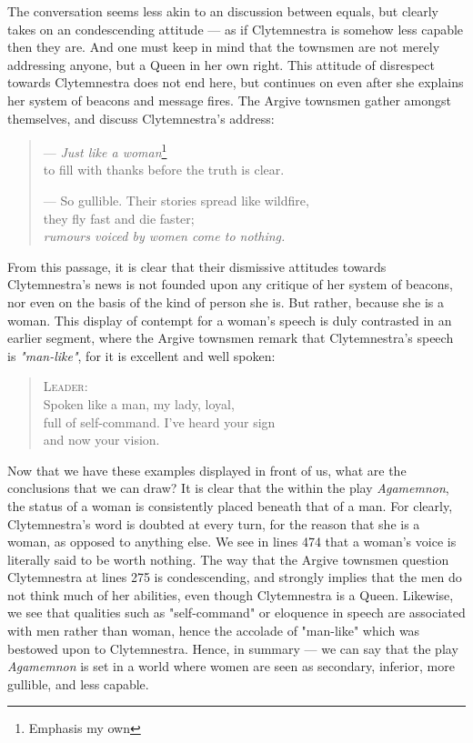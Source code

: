 \noindent
The conversation seems less akin to an discussion between equals, but clearly
takes on an condescending attitude --- as if Clytemnestra is somehow less
capable then they are. And one must keep in mind that the townsmen are
not merely addressing anyone, but a Queen in her own right. This attitude of
disrespect towards Clytemnestra does not end here, but continues on even after
she explains her system of beacons and message fires. The Argive townsmen gather
amongst themselves, and discuss Clytemnestra's address:

\begin{quote}
  --- \emph{Just like a woman}\footnote{Emphasis my own} \\
  to fill with thanks before the truth is clear.

  --- So gullible. Their stories spread like wildfire, \\
  they fly fast and die faster; \\
  \emph{rumours voiced by women come to nothing.}\footnotemark[4]

  \autocite[474]{fagles}
\end{quote}

\noindent
From this passage, it is clear that their dismissive attitudes towards
Clytemnestra's news is not founded upon any critique of her system of beacons,
nor even on the basis of the kind of person she is. But rather, because she
is a woman. This display of contempt for a woman's speech is duly contrasted in
an earlier segment, where the Argive townsmen remark that Clytemnestra's
speech is \emph{"man-like"}, for it is excellent and well spoken:

\begin{quote}
  \textsc{Leader}: \\
  Spoken like a man, my lady, loyal, \\
  full of self-command. I've heard your sign \\
  and now your vision.

  \autocite[355]{fagles}
\end{quote}

Now that we have these examples displayed in front of us, what are the
conclusions that we can draw? It is clear that the within the play
\emph{Agamemnon}, the status of a woman is consistently placed beneath that of a
man. For clearly, Clytemnestra's word is doubted at every turn, for the reason
that she is a woman, as opposed to anything else. We see in lines 474 that a
woman's voice is literally said to be worth nothing. The way that the Argive
townsmen question Clytemnestra at lines 275 is condescending, and strongly
implies that the men do not think much of her abilities, even though
Clytemnestra is a Queen. Likewise, we see that qualities such as "self-command"
or eloquence in speech are associated with men rather than woman, hence the
accolade of "man-like" which was bestowed upon to Clytemnestra. Hence, in
summary --- we can say that the play \emph{Agamemnon} is set in a world where
women are seen as secondary, inferior, more gullible, and less capable.

